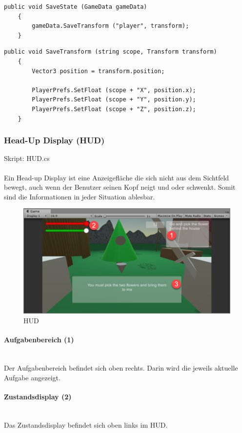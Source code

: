 \begin{lstlisting}[caption={Methode SaveState in Player}]
	public void SaveState (GameData gameData)
	{
		gameData.SaveTransform ("player", transform);
	}
\end{lstlisting}

\begin{lstlisting}[caption={Methode SaveTransform in GameData}]
	public void SaveTransform (string scope, Transform transform)
	{
		Vector3 position = transform.position;

		PlayerPrefs.SetFloat (scope + "X", position.x);
		PlayerPrefs.SetFloat (scope + "Y", position.y);
		PlayerPrefs.SetFloat (scope + "Z", position.z);
	}
\end{lstlisting}

\subsubsection{Head-Up Display (HUD)}
Skript: HUD.cs\\\\
Ein Head-up Display ist eine Anzeigefläche die sich nicht aus dem Sichtfeld bewegt, auch wenn der Benutzer seinen Kopf neigt und oder schwenkt.
Somit sind die Informationen in jeder Situation ablesbar.

\begin{figure}[H]
\includegraphics[scale=0.8]{screenshots/hud.png}
\caption{HUD}
\end{figure}

 
\paragraph{Aufgabenbereich (1)}\mbox{} \\
Der Aufgabenbereich befindet sich oben rechts.
Darin wird die jeweils aktuelle Aufgabe angezeigt.

\paragraph{Zustandsdisplay (2)}\mbox{} \\
Das Zustandsdisplay befindet sich oben links im HUD.

